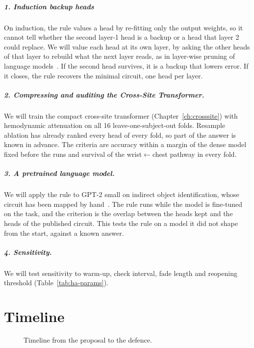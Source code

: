 \paragraph{1. Induction backup heads}
On induction, the rule values a head by re-fitting only the output weights, so it cannot tell whether the second layer-1 head is a backup or a head that layer 2 could replace. We will value each head at its own layer, by asking the other heads of that layer to rebuild what the next layer reads, as in layer-wise pruning of language models~\citep{ziplm}. If the second head survives, it is a backup that lowers error. If it closes, the rule recovers the minimal circuit, one head per layer. 

\paragraph{2. Compressing and auditing the Cross-Site Transformer.}
We will train the compact cross-site transformer (Chapter~\ref{ch:crosssite}) with hemodynamic attenuation on all 16 leave-one-subject-out folds. Resample ablation has already ranked every head of every fold, so part of the answer is known in advance. The criteria are accuracy within a margin of the dense model fixed before the runs and survival of the wrist$\leftarrow$chest pathway in every fold.

\paragraph{3. A pretrained language model.}
We will apply the rule to GPT-2 small on indirect object identification, whose circuit has been mapped by hand~\citep{wang2023interpretability}. The rule runs while the model is fine-tuned on the task, and the criterion is the overlap between the heads kept and the heads of the published circuit. This tests the rule on a model it did not shape from the start, against a known answer.

\paragraph{4. Sensitivity.}
We will test sensitivity to warm-up, check interval, fade length and reopening threshold (Table~\ref{tab:ha-params}).

\chapter{Timeline}
\label{ch:timeline}
\setcounter{figure}{0}

\begin{figure}[htbp]
  \centering
  \resizebox{\textwidth}{!}{}
  \caption[Timeline]{Timeline from the proposal to the defence.}
  \label{fig:timeline}
\end{figure}